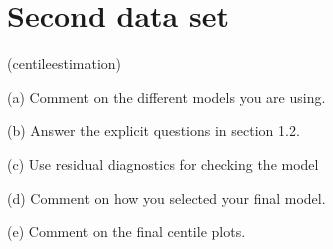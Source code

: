 \section{Second data set}

(centileestimation)

(a) Comment on the different models you are using.

(b) Answer the explicit questions in section 1.2.

(c) Use residual diagnostics for checking the model

(d) Comment on how you selected your final model.

(e) Comment on the final centile plots.


